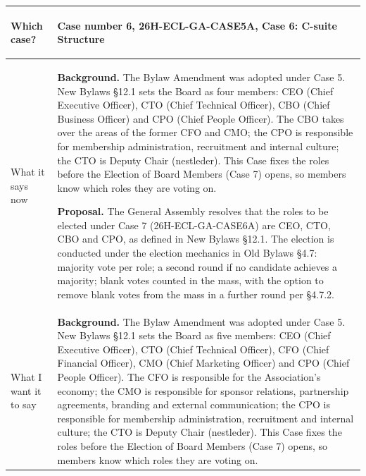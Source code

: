 \documentclass{../../Common/Latex/Templates/rapport}
\begin{document}
\vspace{0.4cm}
\begin{tabularx}{\textwidth}{|>{\bfseries\raggedright\arraybackslash}p{3.7cm}|X|}
  \hline
  Which case?
   & \rule{0pt}{1.2cm}Case number 6, 26H-ECL-GA-CASE5A, Case 6: C-suite Structure                                                                                                                                                                                                                                                                                                                                                                                                                                                                                                                                                                                                                                                               \\
  \hline
  What it says now
   & \rule{0pt}{1.2cm}\textbf{Background.} The Bylaw Amendment was adopted under Case 5. New Bylaws \S 12.1 sets the Board as four members: CEO (Chief Executive Officer), CTO (Chief Technical Officer), CBO (Chief Business Officer) and CPO (Chief People Officer). The CBO takes over the areas of the former CFO and CMO; the CPO is responsible for membership administration, recruitment and internal culture; the CTO is Deputy Chair (nestleder). This Case fixes the roles before the Election of Board Members (Case 7) opens, so members know which roles they are voting on.\par\medskip
  \textbf{Proposal.} The General Assembly resolves that the roles to be elected under Case 7 (26H-ECL-GA-CASE6A) are CEO, CTO, CBO and CPO, as defined in New Bylaws \S 12.1. The election is conducted under the election mechanics in Old Bylaws \S 4.7: majority vote per role; a second round if no candidate achieves a majority; blank votes counted in the mass, with the option to remove blank votes from the mass in a further round per \S 4.7.2.                                                                                                                                                                                                                                                                                    \\
  \hline
  What I want it to say
   & \rule{0pt}{1.2cm}\textbf{Background.} The Bylaw Amendment was adopted under Case 5. New Bylaws \S 12.1 sets the Board as five members: CEO (Chief Executive Officer), CTO (Chief Technical Officer), CFO (Chief Financial Officer), CMO (Chief Marketing Officer) and CPO (Chief People Officer). The CFO is responsible for the Association's economy; the CMO is responsible for sponsor relations, partnership agreements, branding and external communication; the CPO is responsible for membership administration, recruitment and internal culture; the CTO is Deputy Chair (nestleder). This Case fixes the roles before the Election of Board Members (Case 7) opens, so members know which roles they are voting on.\par\medskip

\end{tabularx}
\end{document}
